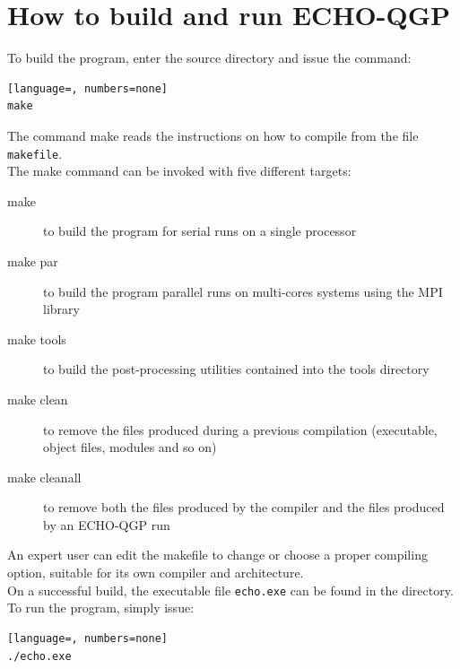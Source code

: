 \section{How to build and run ECHO-QGP}
To build the program,  enter the source directory and issue the command:
\begin{lstlisting}[language=, numbers=none]
make
\end{lstlisting}
The command make reads the instructions on how to compile from the file {\tt makefile}.\\ 
The make command can be invoked with five different targets:
\begin{description}
\item[make] to build the program for serial runs on a single processor
\item[make par] to build the program parallel runs on multi-cores systems using the MPI library
\item[make tools] to build the post-processing utilities contained into the tools directory
\item[make clean] to remove the files produced during a previous compilation (executable, object files, modules and so on)
\item[make cleanall] to remove both the files produced by the compiler and the files produced by an ECHO-QGP run
\end{description}
An expert user can edit the makefile to change or choose a proper compiling option, suitable for its own compiler and architecture.\\
On a successful build, the executable file {\tt echo.exe} can be found in the directory.
To run the program, simply issue:
\begin{lstlisting}[language=, numbers=none]
./echo.exe
\end{lstlisting}


